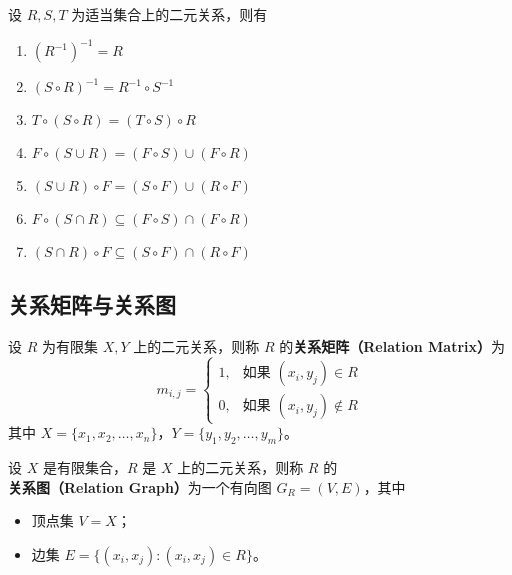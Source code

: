 \begin{proposition}
    设 $ R, S, T $ 为适当集合上的二元关系，则有
    \begin{enumerate}
        \item $ (R^{-1})^{-1} = R $
        \item $ (S\circ R)^{-1} = R^{-1}\circ S^{-1} $
        \item $ T\circ (S\circ R) = (T\circ S)\circ R $
        \item $ F\circ (S \cup R) = (F\circ S) \cup (F\circ R) $
        \item $ (S \cup R)\circ F = (S\circ F) \cup (R\circ F) $
        \item $ F\circ (S \cap R) \subseteq (F\circ S) \cap (F\circ R) $
        \item $ (S \cap R)\circ F \subseteq (S\circ F) \cap (R\circ F) $
    \end{enumerate}
\end{proposition}
\vspace{1em}

\subsection{关系矩阵与关系图}

\begin{definition}[关系矩阵]
    设 $ R $ 为有限集 $ X, Y $ 上的二元关系，则称 $ R $ 的\textbf{关系矩阵（Relation Matrix）}为
    \[
        m_{i,j} = \begin{cases}
            1, & \text{如果 } (x_i,y_j)\in R \\
            0, & \text{如果 } (x_i,y_j)\notin R
        \end{cases}
    \]
    其中 $ X=\{x_1, x_2, \ldots, x_n\} $，$ Y=\{y_1, y_2, \ldots, y_m\} $。
\end{definition}
\vspace{0.5em}

\begin{definition}[关系图]
    设 $ X $ 是有限集合，$ R $ 是 $ X $ 上的二元关系，则称 $ R $ 的\textbf{关系图（Relation Graph）}为一个有向图 $ G_R = (V,E) $，其中
    \begin{itemize}
        \item 顶点集 $ V = X $；
        \item 边集 $ E = \{(x_i,x_j) : (x_i,x_j)\in R\} $。
    \end{itemize}
\end{definition}

\vspace{1em}
